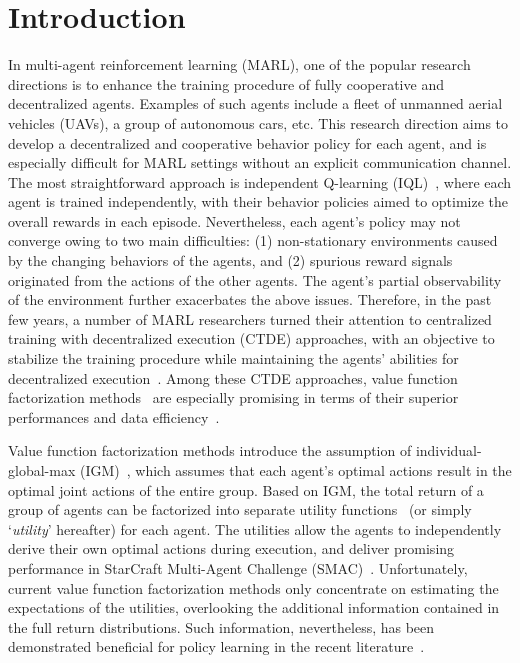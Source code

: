 \documentclass{article}
\begin{document}
\section{Introduction}
\label{sec:introduction}


In multi-agent reinforcement learning (MARL), one of the popular research directions is to enhance the training procedure of fully cooperative and decentralized agents. Examples of such agents include a fleet of unmanned aerial vehicles (UAVs), a group of autonomous cars, etc. This research direction aims to develop a decentralized and cooperative behavior policy for each agent, and is especially difficult for MARL settings without an explicit communication channel. The most straightforward approach is independent Q-learning (IQL)~\cite{Tan1993IQL}, where each agent is trained independently, with their behavior policies aimed to optimize the overall rewards in each episode. Nevertheless, each agent's policy may not converge owing to two main difficulties: (1) non-stationary environments caused by the changing behaviors of the agents, and (2) spurious reward signals originated from the actions of the other agents. The agent’s partial observability of the environment further exacerbates the above issues.
Therefore, in the past few years, a number of MARL researchers turned their attention to centralized training with decentralized execution (CTDE) approaches, with an objective to stabilize the training procedure while maintaining the agents' abilities for decentralized execution~\cite{Oliehoek2016CTDE}. Among these CTDE approaches, value function factorization methods~\cite{Sunehag2018VDN,Rashid2018QMIX,Son2019QTRAN} are especially promising in terms of their superior performances and data efficiency~\cite{Samvelyan2019SMAC}.



Value function factorization methods introduce the assumption of individual-global-max (IGM)~\cite{Son2019QTRAN}, which assumes that each agent's optimal actions result in the optimal joint actions of the entire group.
Based on IGM, the total return of a group of agents can be factorized into separate utility functions~\cite{Guestrin2001Utility} (or simply `\textit{utility}' hereafter) for each agent. The utilities allow the agents to independently derive their own optimal actions during execution, and deliver promising performance in StarCraft Multi-Agent Challenge (SMAC)~\cite{Samvelyan2019SMAC}. Unfortunately, current value function factorization methods only concentrate on estimating the expectations of the utilities, overlooking the additional information contained in the full return distributions. Such information, nevertheless, has been demonstrated beneficial for policy learning in the recent literature~\cite{Lyle2019Comparative}.
\end{document}
